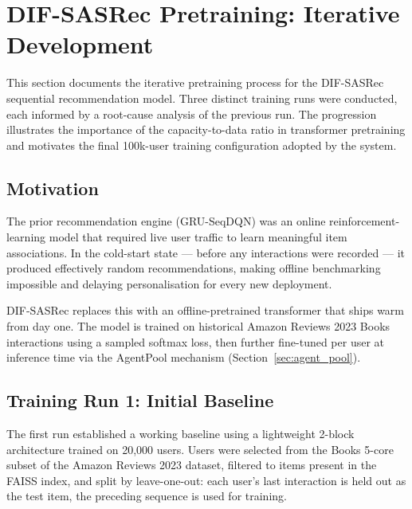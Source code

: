\section{DIF-SASRec Pretraining: Iterative Development}
\label{sec:dif_sasrec_training}

This section documents the iterative pretraining process for the DIF-SASRec sequential recommendation model.
Three distinct training runs were conducted, each informed by a root-cause analysis of the previous run.
The progression illustrates the importance of the capacity-to-data ratio in transformer pretraining and motivates the final 100k-user training configuration adopted by the system.

\subsection{Motivation}

The prior recommendation engine (GRU-SeqDQN) was an online reinforcement-learning model that required live user traffic to learn meaningful item associations.
In the cold-start state — before any interactions were recorded — it produced effectively random recommendations, making offline benchmarking impossible and delaying personalisation for every new deployment.

DIF-SASRec replaces this with an offline-pretrained transformer that ships warm from day one.
The model is trained on historical Amazon Reviews 2023 Books interactions using a sampled softmax loss, then further fine-tuned per user at inference time via the AgentPool mechanism (Section~\ref{sec:agent_pool}).

\subsection{Training Run 1: Initial Baseline}
\label{sec:train_run1}

The first run established a working baseline using a lightweight 2-block architecture trained on 20{,}000 users.
Users were selected from the Books 5-core subset of the Amazon Reviews 2023 dataset, filtered to items present in the FAISS index, and split by leave-one-out: each user's last interaction is held out as the test item, the preceding sequence is used for training.

